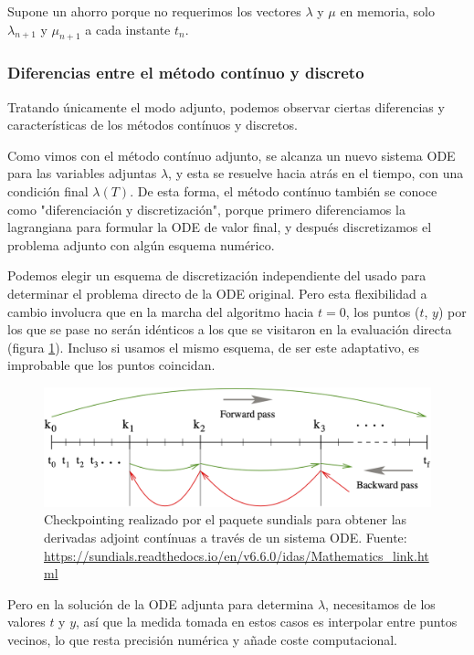 Supone un ahorro porque no requerimos los vectores $\lambda$ y $\mu$ en
memoria, solo $\lambda_{n+1}$ y $\mu_{n+1}$ a cada instante $t_n$.


\subsubsection{Diferencias entre el método contínuo y discreto}

Tratando únicamente el modo adjunto, podemos observar ciertas diferencias y
características de los métodos contínuos y discretos.

Como vimos con el método contínuo adjunto, se alcanza un nuevo sistema ODE para
las variables adjuntas $\lambda$, y esta se resuelve hacia atrás en el tiempo,
con una condición final $\lambda(T)$. De esta forma, el método contínuo también
se conoce como "diferenciación y discretización", porque primero diferenciamos
la lagrangiana para formular la ODE de valor final, y después discretizamos el
problema adjunto con algún esquema numérico.

Podemos elegir un esquema de discretización independiente del usado para
determinar el problema directo de la ODE original. Pero esta flexibilidad a
cambio involucra que en la marcha del algoritmo hacia $t = 0$, los puntos ($t$,
$y$) por los que se pase no serán idénticos a los que se visitaron en la
evaluación directa (figura \ref{fig:ode_adjoint_checkpointing_sundials}).
Incluso si usamos el mismo esquema, de ser este adaptativo, es improbable que
los puntos coincidan.

\begin{figure}[h]
	\centering
	\includegraphics[width=1\textwidth]{./capitulos/metodologia/images/ode_adjoint_checkpointing_sundials.png}
	\caption{Checkpointing realizado por el paquete sundials para obtener las
		derivadas adjoint contínuas a través de un sistema ODE. Fuente:
		\url{https://sundials.readthedocs.io/en/v6.6.0/idas/Mathematics_link.html}}
	\label{fig:ode_adjoint_checkpointing_sundials}
\end{figure}

Pero en la solución de la ODE adjunta para determina $\lambda$, necesitamos de
los valores $t$ y $y$, así que la medida tomada en estos casos es interpolar
entre puntos vecinos, lo que resta precisión numérica y añade coste
computacional.

